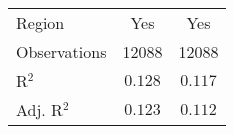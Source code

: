 \begin{center}
\begin{tiny}
\begin{longtable}{l@{} c@{} c@{}}
\hline
Region                                                                      & Yes              & Yes              \\
Observations                                                                & 12088            & 12088            \\
R$^2$                                                                       & $0.128$          & $0.117$          \\
Adj. R$^2$                                                                  & $0.123$          & $0.112$          \\
\end{longtable}
\end{tiny}
\end{center}

